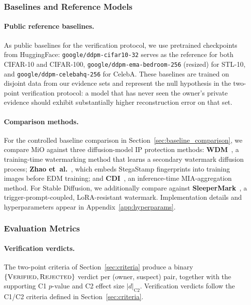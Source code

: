 \documentclass{article}
\begin{document}
\subsubsection{Baselines and Reference Models}
\label{sec:setup_baselines}

\paragraph{Public reference baselines.}
As public baselines for the verification protocol, we use pretrained checkpoints from HuggingFace: \texttt{google/ddpm-cifar10-32} serves as the reference for both CIFAR-10 and CIFAR-100, \texttt{google/ddpm-ema-bedroom-256} (resized) for STL-10, and \texttt{google/ddpm-celebahq-256} for CelebA. These baselines are trained on disjoint data from our evidence sets and represent the null hypothesis in the two-point verification protocol: a model that has never seen the owner's private evidence should exhibit substantially higher reconstruction error on that set.

\paragraph{Comparison methods.}
For the controlled baseline comparison in Section~\ref{sec:baseline_comparison}, we compare MiO against three diffusion-model IP protection methods: \textbf{WDM}~\citep{peng2023watermark}, a training-time watermarking method that learns a secondary watermark diffusion process; \textbf{Zhao et~al.}~\citep{zhao2023recipe}, which embeds StegaStamp fingerprints into training images before EDM training; and \textbf{CDI}~\citep{dubinski2024cdi}, an inference-time MIA-aggregation method. For Stable Diffusion, we additionally compare against \textbf{SleeperMark}~\citep{wang2025sleepermark}, a trigger-prompt-coupled, LoRA-resistant watermark. Implementation details and hyperparameters appear in Appendix~\ref{app:hyperparams}.

\subsubsection{Evaluation Metrics}
\label{sec:setup_metrics}
\paragraph{Verification verdicts.}
The two-point criteria of Section~\ref{sec:criteria} produce a binary $\{\textsc{Verified}, \textsc{Rejected}\}$ verdict per (owner, suspect) pair, together with the supporting C1 $p$-value and C2 effect size $|d|_{\text{C2}}$. Verification verdicts follow the C1/C2 criteria defined in Section~\ref{sec:criteria}.
\end{document}
